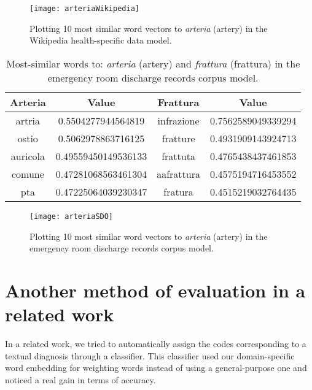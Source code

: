 \begin{figure}[ht]
	\centering
	\texttt{[image: arteriaWikipedia]}
	\caption[Artery - 10 most similar words plotted for Wikipedia health-specific model]{Plotting 10 most similar word vectors to \textit{arteria} (artery) in the Wikipedia health-specific data model.}
	\label{fig:arteriaWikipediaSpecific}
\end{figure}

\begin{table}[h!]
	\begin{center}
		\caption[Domain Specific - Most similar words in emergency room discharge records corpus model]{Most-similar words to: \textit{arteria} (artery) and \textit{frattura} (frattura) in the emergency room discharge records corpus model.}
		\label{tab:tableSDO}
		\begin{tabular}{c|S|c|S}
			\toprule
			\textbf{Arteria} & \textbf{Value} & \textbf{Frattura} & \textbf{Value} \\
			\midrule
			artria & 0.5504277944564819 & infrazione & 0.7562589049339294 \\
			ostio & 0.5062978863716125 & fratture & 0.4931909143924713 \\
			auricola & 0.49559450149536133 & frattuta & 0.4765438437461853 \\
			comune & 0.47281068563461304 & aafrattura & 0.4575194716453552 \\
			pta & 0.47225064039230347 & fratura & 0.4515219032764435 \\
			\bottomrule
		\end{tabular}
	\end{center}
\end{table}

\begin{figure}[ht]
	\centering
	\texttt{[image: arteriaSDO]}
	\caption[Artery - 10 most similar words plotted for Emergency room discharge records model]{Plotting 10 most similar word vectors to \textit{arteria} (artery) in the emergency room discharge records corpus model.}
	\label{fig:arteriaSDO}
\end{figure}

\section{Another method of evaluation in a related work}

In a related work, we tried to automatically assign the codes corresponding to a textual diagnosis through a classifier. This classifier used our domain-specific word embedding for weighting words instead of using a general-purpose one and noticed a real gain in terms of accuracy.

